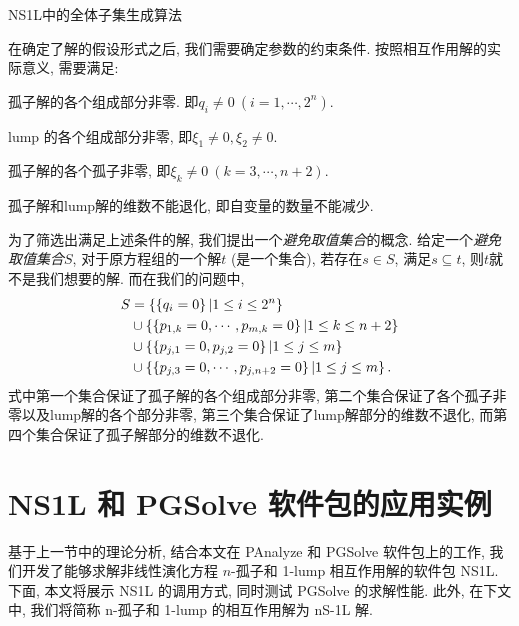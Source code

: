 \begin{algorithm}
\caption{NS1L中的全体子集生成算法}\label{allsubset}
\end{algorithm}

在确定了解的假设形式之后, 我们需要确定参数的约束条件. 按照相互作用解的实际意义, 需要满足:
\begin{compactenum}[(1)]
\item 孤子解的各个组成部分非零. 即$q_i\neq 0~(i=1,\cdots,2^n)$.
\item lump 的各个组成部分非零, 即$\xi_1\neq 0,\xi_2\neq 0$.
\item 孤子解的各个孤子非零, 即$\xi_k\neq 0~(k=3,\cdots,n+2)$.
\item 孤子解和lump解的维数不能退化, 即自变量的数量不能减少. 
\end{compactenum}

为了筛选出满足上述条件的解, 我们提出一个\emph{避免取值集合}的概念. 给定一个\emph{避免取值集合}$S$, 对于原方程组的一个解$t$ (是一个集合), 若存在$s\in S$, 满足$s\subseteq t$, 则$t$就不是我们想要的解. 而在我们的问题中, 
\begin{equation}
\begin{split}
    S&=\left\{\left\{q_i=0\right\}|1\le i \le 2^n\right\} \\ 
     &\cup \left\{\left\{p_{1,k}=0,\cdots,p_{m,k}=0\right\}|1\le k \le n+2\right\}  \\
     &\cup \left\{\left\{p_{j,1}=0,p_{j,2}=0\right\}|1\le j \le m\right\} \\ 
     &\cup \left\{\left\{p_{j,3}=0,\cdots,p_{j,n+2}=0\right\}|1\le j \le m\right\} . 
\end{split}
\end{equation}
式中第一个集合保证了孤子解的各个组成部分非零, 第二个集合保证了各个孤子非零以及lump解的各个部分非零, 第三个集合保证了lump解部分的维数不退化, 而第四个集合保证了孤子解部分的维数不退化.

\section{NS1L 和 PGSolve 软件包的应用实例}
基于上一节中的理论分析, 结合本文在 PAnalyze 和 PGSolve 软件包上的工作, 我们开发了能够求解非线性演化方程 $n$-孤子和 1-lump 相互作用解的软件包 NS1L. 下面, 本文将展示 NS1L 的调用方式, 同时测试 PGSolve 的求解性能. 此外, 在下文中, 我们将简称 n-孤子和 1-lump 的相互作用解为 nS-1L 解. 

